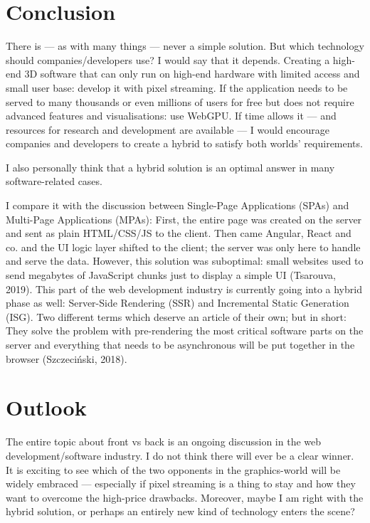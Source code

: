 \documentclass[10pt]{article}
\begin{document}
\begin{sloppypar}
  \section{Conclusion}
  \label{sec:conclusion}

  There is — as with many things — never a simple solution. But which technology should companies/developers use? I would say that it depends. Creating a high-end 3D software that can only run on high-end hardware with limited access and small user base: develop it with pixel streaming. If the application needs to be served to many thousands or even millions of users for free but does not require advanced features and visualisations: use WebGPU. If time allows it — and resources for research and development are available — I would encourage companies and developers to create a hybrid to satisfy both worlds’ requirements.

  I also personally think that a hybrid solution is an optimal answer in many software-related cases.

  I compare it with the discussion between Single-Page Applications (SPAs) and Multi-Page Applications (MPAs): First, the entire page was created on the server and sent as plain HTML/CSS/JS to the client. Then came Angular, React and co. and the UI logic layer shifted to the client; the server was only here to handle and serve the data. However, this solution was suboptimal: small websites used to send megabytes of JavaScript chunks just to display a simple UI (Tsarouva, 2019). This part of the web development industry is currently going into a hybrid phase as well: Server-Side Rendering (SSR) and Incremental Static Generation (ISG). Two different terms which deserve an article of their own; but in short: They solve the problem with pre-rendering the most critical software parts on the server and everything that needs to be asynchronous will be put together in the browser (Szczeciński, 2018).

  \section{Outlook}
  \label{sec:outlook}

  The entire topic about front vs back is an ongoing discussion in the web development/software industry. I do not think there will ever be a clear winner. It is exciting to see which of the two opponents in the graphics-world will be widely embraced — especially if pixel streaming is a thing to stay and how they want to overcome the high-price drawbacks. Moreover, maybe I am right with the hybrid solution, or perhaps an entirely new kind of technology enters the scene?



  \pagebreak
  
  

\end{sloppypar}
\end{document}

